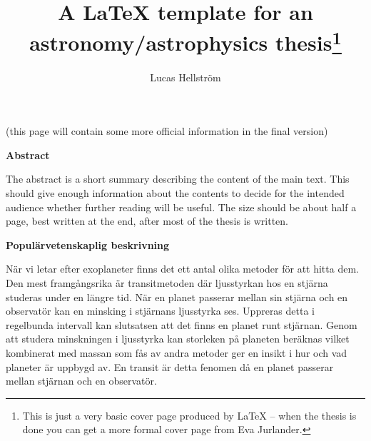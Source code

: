 \documentclass[12pt]{report}
\begin{document}
\title{\huge \bf A LaTeX template for an astronomy/astrophysics
thesis\footnote{This is just a very basic cover page produced by LaTeX -- when
the thesis is done you can get a more formal cover page from Eva Jurlander.}}
\author{Lucas Hellström}

\thispagestyle{empty} %

\maketitle

\newpage

\thispagestyle{empty}

\begin{center}
  (this page will contain some more official information in the final version)
\end{center}

\newpage

\thispagestyle{empty}

\begin{center}
  {\bf Abstract}
\end{center}
The abstract is a short summary describing the content of the main text. This
should give enough information about the contents to decide for the intended
audience whether further reading will be useful. The size should be about half
a page, best written at the end, after most of the thesis is written.

\newpage

\thispagestyle{empty}
\mbox{} %

\newpage

\thispagestyle{empty}

\begin{center}
  {\bf Popul\"arvetenskaplig beskrivning}
\end{center}
	När vi letar efter exoplaneter finns det ett antal olika metoder för att hitta dem. Den mest framgångsrika är transitmetoden där ljusstyrkan hos en stjärna studeras under en längre tid. När en planet passerar mellan sin stjärna och en observatör kan en minsking i stjärnans ljusstyrka ses. Uppreras detta i regelbunda intervall kan slutsatsen att det finns en planet runt stjärnan. Genom att studera minskningen i ljusstyrka kan storleken på planeten beräknas vilket kombinerat med massan som fås av andra metoder ger en insikt i hur och vad planeter är uppbygd av. En transit är detta fenomen då en planet passerar mellan stjärnan och en observatör.
	
\end{document}
